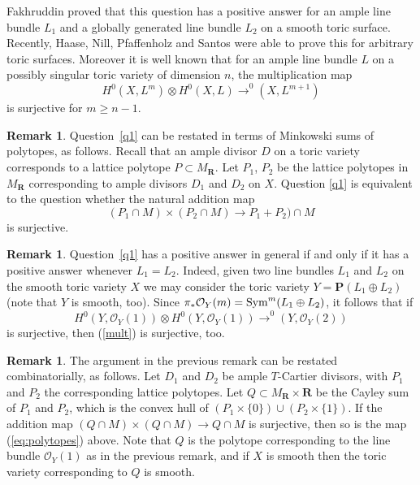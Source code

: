 \documentclass[12pt]{amsart}
\theoremstyle{definition}
\newtheorem{remark}[lemma]{Remark}
\theoremstyle{remark}
\begin{document}
Fakhruddin \cite{Fakhruddin} proved that this question has a positive 
answer for an ample line bundle $L_1$ and a globally 
generated line bundle $L_2$  on a smooth toric surface. Recently,
Haase, Nill, Pfaffenholz and Santos \cite{HNPS}
 were able to prove this 
for arbitrary toric surfaces. Moreover it is well known 
\cite{EwaldWessels, LiuTrotterZiegler, BrunsGubeladzeTrung} 
that for an ample line bundle $L$ on a 
possibly singular toric variety of dimension $n$,
the multiplication map 
\begin{equation}
H^0(X,L^m)\otimes H^0(X,L){\xrightarrow{\ \ }}^0(X,L^{m+1})
\end{equation}
is surjective for $m\geq n-1$.  

\begin{remark}\label{reformulation_Minkowski}
Question~\ref{q1} can be restated in terms of Minkowski sums of polytopes, as follows.
Recall that an ample divisor $D$ on a toric variety corresponds 
to a lattice polytope $P\subset M_{{\mathbf R}}$.  
Let $P_1$, $P_2$ be the lattice polytopes in $M_{{\mathbf R}}$ 
corresponding to ample divisors $D_1$ and $D_2$ on $X$. Question \ref{q1}
is equivalent to the question whether the natural addition map
\begin{equation}\label{eq:polytopes}
(P_1\cap M) \times (P_2\cap M) {\xrightarrow{\ \ }}P_1+P_2)\cap M
\end{equation}
 is surjective. 
\end{remark}

\begin{remark}\label{rem4}
Question~\ref{q1} has a positive answer in general if and only if it has a
positive answer whenever $L_1=L_2$. Indeed, given two line bundles
$L_1$ and $L_2$ on the smooth toric variety $X$ we may consider the
toric variety $Y={{\mathbf P}}(L_1\oplus L_2)$ (note that $Y$ is smooth, too).
Since $\pi_*{\mathcal{O}}_Y(m)={\rm Sym}^m(L_1\oplus L_2)$, it follows that if
$$H^0(Y,{\mathcal{O}}_Y(1))\otimes H^0(Y,{\mathcal{O}}_Y(1)){\xrightarrow{\ \ }}^0(Y,{\mathcal{O}}_Y(2))$$
is surjective, then (\ref{mult}) is surjective, too.
\end{remark}

\begin{remark}
The argument in the previous remark can be restated combinatorially, as follows.
Let $D_1$ and $D_2$ be ample $T$-Cartier divisors, with 
$P_1$ and $P_2$ the corresponding lattice polytopes. 
Let $Q \subset M_{{\mathbf R}} \times {{\mathbf R}}$ be the Cayley sum of $P_1$ and $P_2$, which is the
convex hull of $(P_1 \times \{ 0 \}) \cup (P_2 \times \{1\})$. 
If the addition map $(Q\cap M) \times (Q\cap M) {\xrightarrow{\ \ }}Q\cap M$ is 
surjective, then so is the map (\ref{eq:polytopes}) above. Note that 
$Q$ is the polytope corresponding to the line bundle ${\mathcal{O}}_Y(1)$ as in 
the previous remark, and if $X$ is smooth then the toric variety corresponding to 
$Q$ is smooth.  
\end{remark}  
\end{document}
